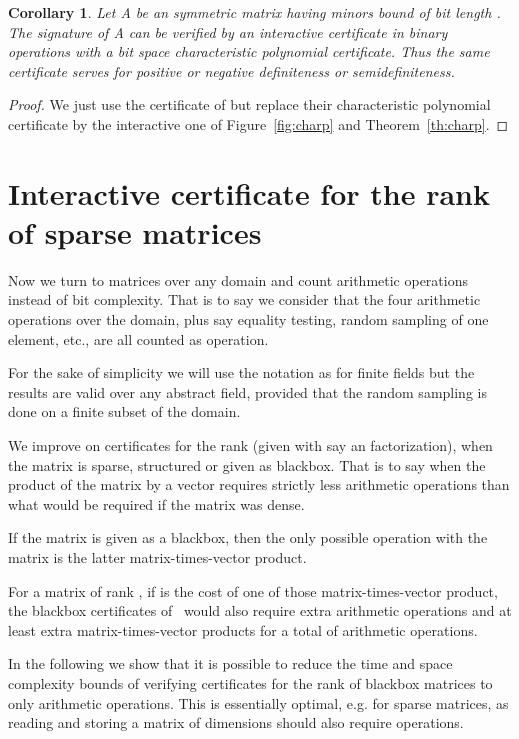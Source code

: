 \documentclass{article}
\newcommand{\customlinebreak}{}
\newtheorem{corollary}{Corollary}
\begin{document}
\begin{corollary}
  Let A be an  symmetric matrix having
  minors bound  of bit length . 
  The signature of A can be verified by an interactive certificate in 
   binary operations with a 
   bit space characteristic polynomial certificate. 
  Thus the same certificate serves for positive or negative definiteness
  or semidefiniteness.
\end{corollary}
\begin{proof}
  We just use the certificate of
  \cite[Corollary~1]{Kaltofen:2011:quadcert} but replace their
  characteristic polynomial certificate by the interactive one of
  Figure~\ref{fig:charp} and Theorem~\ref{th:charp}.
\end{proof}

\section{Interactive certificate for{\customlinebreak} the rank of sparse matrices}\label{sec:sparserank}
 
Now we turn to matrices over any domain and count arithmetic
operations instead of bit complexity. That is to say we consider that the four
arithmetic operations over the domain, plus say equality testing, random
sampling of one element, etc., are all counted as  operation.
 
For the sake of simplicity we will use the notation  as for finite fields
but the results are valid over any abstract field, provided that the random
sampling is done on a finite subset  of the domain. 

We improve on  certificates for the rank (given
with say an  factorization), when the matrix is sparse, structured or given
as blackbox. That is to say when the product of the matrix by a vector 
requires strictly less arithmetic operations than what would be required if the
matrix was dense. 
 
If the matrix is given as a blackbox, then the only possible operation with the
matrix is the latter matrix-times-vector product.
 
For a matrix of rank , if  is the cost of one of those
matrix-times-vector product, the blackbox certificates
of~\cite{Saunders:2004:rankcert} would also require  extra arithmetic
operations and at least  extra matrix-times-vector products for a
total of  arithmetic operations.

In the following we show that it is possible to reduce the time and space
complexity bounds of verifying certificates for the rank of blackbox matrices to
only  arithmetic operations. 
This is essentially optimal, e.g. for sparse matrices, as reading and
storing a matrix of dimensions  should also require
 operations. 
 
\end{document}
